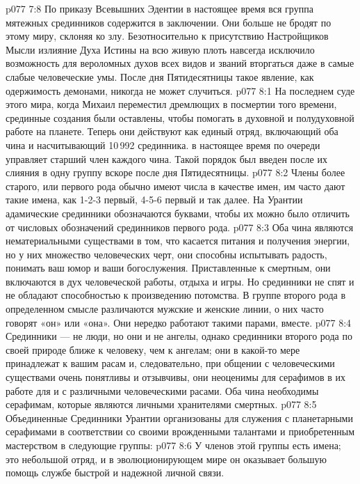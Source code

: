 \vs p077 7:8 По приказу Всевышних Эдентии в настоящее время вся группа мятежных срединников содержится в заключении. Они больше не бродят по этому миру, склоняя ко злу. Безотносительно к присутствию Настройщиков Мысли излияние Духа Истины на всю живую плоть навсегда исключило возможность для вероломных духов всех видов и званий вторгаться даже в самые слабые человеческие умы. После дня Пятидесятницы такое явление, как одержимость демонами, никогда не может случиться.
\vs p077 8:1 На последнем суде этого мира, когда Михаил переместил дремлющих в посмертии того времени, срединные создания были оставлены, чтобы помогать в духовной и полудуховной работе на планете. Теперь они действуют как единый отряд, включающий оба чина и насчитывающий 10\,992 срединника.  в настоящее время по очереди управляет старший член каждого чина. Такой порядок был введен после их слияния в одну группу вскоре после дня Пятидесятницы.
\vs p077 8:2 Члены более старого, или первого рода обычно имеют числа в качестве имен, им часто дают такие имена, как 1\hyp{}2\hyp{}3 первый, 4\hyp{}5\hyp{}6 первый и так далее. На Урантии адамические срединники обозначаются буквами, чтобы их можно было отличить от числовых обозначений срединников первого рода.
\vs p077 8:3 Оба чина являются нематериальными существами в том, что касается питания и получения энергии, но у них множество человеческих черт, они способны испытывать радость, понимать ваш юмор и ваши богослужения. Приставленные к смертным, они включаются в дух человеческой работы, отдыха и игры. Но срединники не спят и не обладают способностью к произведению потомства. В группе второго рода в определенном смысле различаются мужские и женские линии, о них часто говорят «он» или «она». Они нередко работают такими парами, вместе.
\vs p077 8:4 Срединники --- не люди, но они и не ангелы, однако срединники второго рода по своей природе ближе к человеку, чем к ангелам; они в какой\hyp{}то мере принадлежат к вашим расам и, следовательно, при общении с человеческими существами очень понятливы и отзывчивы, они неоценимы для серафимов в их работе для и с различными человеческими расами. Оба чина необходимы серафимам, которые являются личными хранителями смертных.
\vs p077 8:5 \pc Объединенные Срединники Урантии организованы для служения с планетарными серафимами в соответствии со своими врожденными талантами и приобретенным мастерством в следующие группы:
\vs p077 8:6 \bibnobreakspace {} У членов этой группы есть имена; это небольшой отряд, и в эволюционирующем мире он оказывает большую помощь службе быстрой и надежной личной связи.
